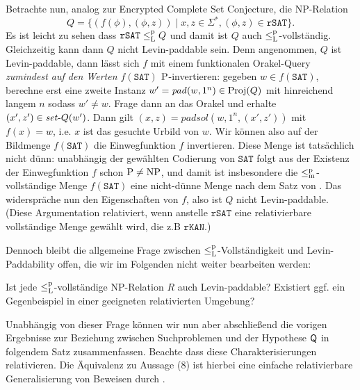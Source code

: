 Betrachte nun, analog zur Encrypted Complete Set Conjecture, die NP-Relation
\[ Q = \{ (f(\phi), (\phi, z)) \mid x,z\in\Sigma^*, (\phi,z)\in\mathtt{rSAT}\}. \]
Es ist leicht zu sehen dass $\mathtt{rSAT}\leqlp Q$ und damit ist $Q$ auch $\leqlp$-vollständig.
Gleichzeitig kann dann $Q$ nicht Levin-paddable sein.
Denn angenommen, $Q$ ist Levin-paddable, dann lässt sich $f$ mit einem funktionalen Orakel-Query \emph{zumindest auf den Werten $f(\mathtt{SAT})$} $\P$-invertieren: gegeben $w\in f(\mathtt{SAT})$, berechne erst eine zweite Instanz $w'=\mathit{pad}(w, 1^n)\in\Proj(Q)$ mit hinreichend langem $n$ sodass $w'\neq w$. Frage dann an das Orakel und erhalte $(x',z')\in \fset{}Q(w')$.
Dann gilt $(x,z) = \mathit{padsol}(w, 1^n, (x',z'))$ mit $f(x)=w$, i.e. $x$ ist das gesuchte Urbild von $w$.
Wir können also auf der Bildmenge  $f(\mathtt{SAT})$ die Einwegfunktion $f$ invertieren.
Diese Menge ist tatsächlich nicht dünn: unabhängig der gewählten Codierung von $\mathtt{SAT}$ folgt aus der Existenz der Einwegfunktion $f$ schon $\P\neq\NP$, und damit ist insbesondere die $\leqmp$-vollständige Menge $f(\mathtt{SAT})$ eine nicht-dünne Menge nach dem Satz von \textcite{mahaney_sparse_1982}.
Das widerspräche nun den Eigenschaften von $f$, also ist $Q$ nicht Levin-paddable.
(Diese Argumentation relativiert, wenn anstelle $\mathtt{rSAT}$ eine relativierbare vollständige Menge gewählt wird, die z.B $\mathtt{rKAN}$.)

Dennoch bleibt die allgemeine Frage zwischen $\leqlp$-Vollständigkeit und Levin-Paddability offen, die wir im Folgenden nicht weiter bearbeiten werden:
\begin{question}
    Ist jede $\leqlp$-vollständige NP-Relation $R$ auch Levin-paddable?
    Existiert ggf. ein Gegenbeispiel in einer geeigneten relativierten Umgebung?
\end{question}


Unabhängig von dieser Frage können wir nun aber abschließend die vorigen Ergebnisse zur Beziehung zwischen Suchproblemen und der Hypothese $\hQ$ in folgendem Satz zusammenfassen.
Beachte dass diese Charakterisierungen relativieren.
Die Äquivalenz zu Aussage (8) ist hierbei eine einfache relativierbare Generalisierung von Beweisen durch \textcite[Thm.~5.3]{messner_simulation_2001}.

